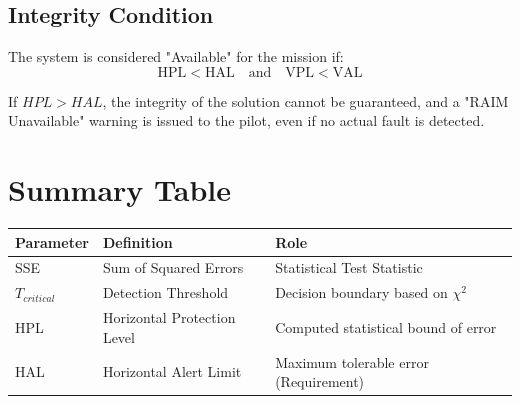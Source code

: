 \documentclass[11pt,a4paper]{article}
\begin{document}
\subsection{Integrity Condition}
The system is considered "Available" for the mission if:
\begin{equation}
    \text{HPL} < \text{HAL} \quad \text{and} \quad \text{VPL} < \text{VAL}
\end{equation}

If $HPL > HAL$, the integrity of the solution cannot be guaranteed, and a "RAIM Unavailable" warning is issued to the pilot, even if no actual fault is detected.

\section{Summary Table}
\begin{table}[h]
\centering
\begin{tabular}{lll}
\toprule
\textbf{Parameter} & \textbf{Definition} & \textbf{Role} \\
\midrule
SSE & Sum of Squared Errors & Statistical Test Statistic \\
$T_{critical}$ & Detection Threshold & Decision boundary based on $\chi^2$ \\
HPL & Horizontal Protection Level & Computed statistical bound of error \\
HAL & Horizontal Alert Limit & Maximum tolerable error (Requirement) \\
\bottomrule
\end{tabular}
\end{table}
\end{document}
